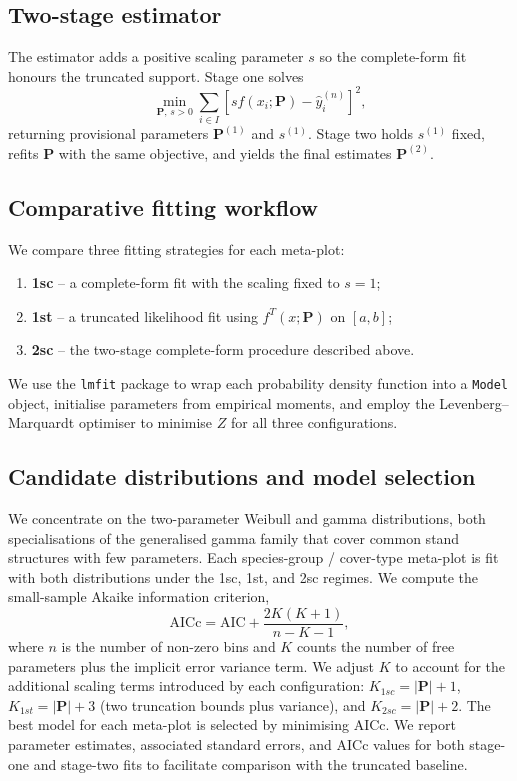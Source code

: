 \subsection{Two-stage estimator}
\label{sec:methods_twostage}

The estimator adds a positive scaling parameter $s$ so the complete-form fit honours the truncated support. Stage one solves
\begin{equation}
  \min_{\bm{P},\, s>0} \sum_{i \in I} \left[s f(x_i; \bm{P}) - \hat{y}_i^{(n)}\right]^2,
\end{equation}
returning provisional parameters $\bm{P}^{(1)}$ and $s^{(1)}$. Stage two holds $s^{(1)}$ fixed, refits $\bm{P}$ with the same objective, and yields the final estimates $\bm{P}^{(2)}$.

\subsection{Comparative fitting workflow}
\label{sec:methods_benchmark}

We compare three fitting strategies for each meta-plot:
\begin{enumerate}
  \item \textbf{1sc} -- a complete-form fit with the scaling fixed to $s = 1$;
  \item \textbf{1st} -- a truncated likelihood fit using $f^{T}(x; \bm{P})$ on $[a, b]$;
  \item \textbf{2sc} -- the two-stage complete-form procedure described above.
\end{enumerate}
We use the \texttt{lmfit} package to wrap each probability density function into a \texttt{Model} object, initialise parameters from empirical moments, and employ the Levenberg--Marquardt optimiser to minimise $Z$ for all three configurations.

\subsection{Candidate distributions and model selection}
\label{sec:methods_candidates}

We concentrate on the two-parameter Weibull and gamma distributions, both specialisations of the generalised gamma family that cover common stand structures with few parameters. Each species-group / cover-type meta-plot is fit with both distributions under the 1sc, 1st, and 2sc regimes. We compute the small-sample Akaike information criterion,
\begin{equation}
  \text{AICc} = \text{AIC} + \frac{2K(K+1)}{n - K - 1},
\end{equation}
where $n$ is the number of non-zero bins and $K$ counts the number of free parameters plus the implicit error variance term. We adjust $K$ to account for the additional scaling terms introduced by each configuration: $K_{1sc} = |\bm{P}| + 1$, $K_{1st} = |\bm{P}| + 3$ (two truncation bounds plus variance), and $K_{2sc} = |\bm{P}| + 2$. The best model for each meta-plot is selected by minimising AICc. We report parameter estimates, associated standard errors, and AICc values for both stage-one and stage-two fits to facilitate comparison with the truncated baseline.
